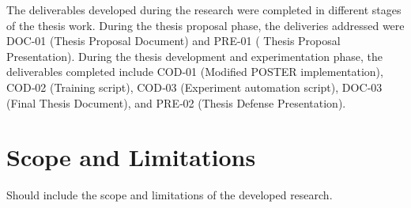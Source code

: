 The deliverables developed during the research were completed in different stages of the thesis work. During the thesis proposal phase, the deliveries addressed were DOC-01 (Thesis Proposal Document) and PRE-01 ( Thesis Proposal Presentation). During the thesis development and experimentation phase, the deliverables completed include COD‑01 (Modified POSTER implementation), COD‑02 (Training script), COD‑03 (Experiment automation script), DOC‑03 (Final Thesis Document), and PRE‑02 (Thesis Defense Presentation). 





\section{Scope and Limitations}
\label{section:scope-limitations}


Should include the scope and limitations of the developed research.


 

